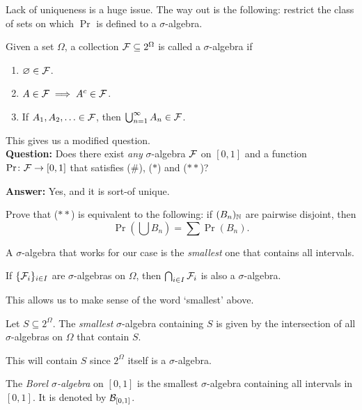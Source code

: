 Lack of uniqueness is a huge issue.
The way out is the following: restrict the class of sets on which $\Pr$ is
defined to a $\sigma$-algebra.

\begin{definition*} \label{def:sigma-algebra}
    Given a set $\Omega$, a collection $\mathcal{F} \subseteq 2^\Omega$ is called a
    $\sigma$-algebra if
    \begin{enumerate}
        \item $\varnothing \in \mathcal{F}$.
        \item $A \in \mathcal{F} \implies A^c \in \mathcal{F}$.
        \item If $A_1, A_2, \ldots \in \mathcal{F}$, then
            $\bigcup_{n=1}^\infty A_n \in \mathcal{F}$.
    \end{enumerate}
\end{definition*}

This gives us a modified question. \\
\textbf{Question:} Does there exist \emph{any} $\sigma$-algebra $\mathcal{F}$ on
$[0, 1]$ and a function $\Pr\colon \mathcal{F} \to [0, 1]$ that satisfies
(\#), ($*$) and ($**$)?%

\textbf{Answer:} Yes, and it is sort-of unique.

\begin{exercise}
    Prove that ($**$) is equivalent to the following:
    if $(B_n)_{\mathbb{N}}$ are pairwise disjoint, then \[
        \Pr(\bigcup B_n) = \sum \Pr(B_n).
    \]
\end{exercise}

A $\sigma$-algebra that works for our case is the \emph{smallest}
one that contains all intervals.

\begin{exercise}
    If $\{\mathcal{F}_i\}_{i \in I}$ are $\sigma$-algebras on $\Omega$, then
    $\bigcap_{i \in I} \mathcal{F}_i$ is also a $\sigma$-algebra.
\end{exercise}

This allows us to make sense of the word `smallest' above.
\begin{definition}
    Let $S \subseteq 2^\Omega$.
    The \emph{smallest} $\sigma$-algebra containing $S$ is given by the
    intersection of all $\sigma$-algebras on $\Omega$ that contain $S$.
\end{definition}
This will contain $S$ since $2^\Omega$ itself is a $\sigma$-algebra.

\begin{definition} \label{def:borel}
    The \emph{Borel $\sigma$-algebra} on $[0, 1]$ is the smallest
    $\sigma$-algebra containing all intervals in $[0, 1]$.
    It is denoted by $\mathcal{B}_{[0, 1]}$.
\end{definition}
